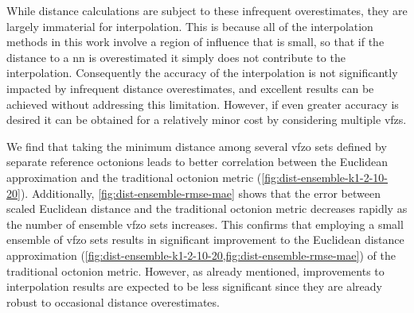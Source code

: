 \documentclass[final,twocolumn,12pt]{elsarticle}
\begin{document}
While distance calculations are subject to these infrequent overestimates, they are largely immaterial for interpolation. This is because all of the interpolation methods in this work involve a region of influence that is small, so that if the distance to a \gls{nn} is overestimated it simply does not contribute to the interpolation. Consequently the accuracy of the interpolation is not significantly impacted by infrequent distance overestimates, and excellent results can be achieved without addressing this limitation. However, if even greater accuracy is desired it can be obtained for a relatively minor cost by considering multiple \glspl{vfz}.

We find that taking the minimum distance among several \gls{vfzo} sets defined by separate reference octonions leads to better correlation between the Euclidean approximation and the traditional octonion metric (\cref{fig:dist-ensemble-k1-2-10-20}). Additionally, \cref{fig:dist-ensemble-rmse-mae} shows that the error between scaled Euclidean distance and the traditional octonion metric decreases rapidly as the number of ensemble \gls{vfzo} sets increases. This confirms that employing a small ensemble of \gls{vfzo} sets results in significant improvement to the Euclidean distance approximation (\cref{fig:dist-ensemble-k1-2-10-20,fig:dist-ensemble-rmse-mae}) of the traditional octonion metric. However, as already mentioned, improvements to interpolation results are expected to be less significant since they are already robust to occasional distance overestimates.

\end{document}
